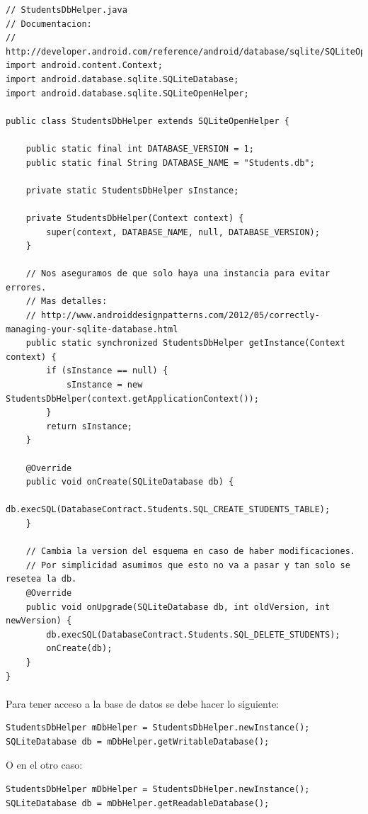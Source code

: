 \documentclass[10pt]{extarticle}
\begin{document}
\begin{lstlisting}
// StudentsDbHelper.java
// Documentacion:
// http://developer.android.com/reference/android/database/sqlite/SQLiteOpenHelper.html
import android.content.Context;
import android.database.sqlite.SQLiteDatabase;
import android.database.sqlite.SQLiteOpenHelper;

public class StudentsDbHelper extends SQLiteOpenHelper {

    public static final int DATABASE_VERSION = 1;
    public static final String DATABASE_NAME = "Students.db";

    private static StudentsDbHelper sInstance;

    private StudentsDbHelper(Context context) {
        super(context, DATABASE_NAME, null, DATABASE_VERSION);
    }
	
	// Nos aseguramos de que solo haya una instancia para evitar errores.
	// Mas detalles: 
	// http://www.androiddesignpatterns.com/2012/05/correctly-managing-your-sqlite-database.html
    public static synchronized StudentsDbHelper getInstance(Context context) {
        if (sInstance == null) {
            sInstance = new StudentsDbHelper(context.getApplicationContext());
        }
        return sInstance;
    }
	
    @Override
    public void onCreate(SQLiteDatabase db) {
        db.execSQL(DatabaseContract.Students.SQL_CREATE_STUDENTS_TABLE);
    }
	
	// Cambia la version del esquema en caso de haber modificaciones.
	// Por simplicidad asumimos que esto no va a pasar y tan solo se resetea la db.
    @Override
    public void onUpgrade(SQLiteDatabase db, int oldVersion, int newVersion) {
        db.execSQL(DatabaseContract.Students.SQL_DELETE_STUDENTS);
        onCreate(db);
    }
}
\end{lstlisting}

\paragraph{}
Para tener acceso a la base de datos se debe hacer lo siguiente:
\begin{lstlisting}
StudentsDbHelper mDbHelper = StudentsDbHelper.newInstance();
SQLiteDatabase db = mDbHelper.getWritableDatabase();
\end{lstlisting}
O en el otro caso:
\begin{lstlisting}
StudentsDbHelper mDbHelper = StudentsDbHelper.newInstance();
SQLiteDatabase db = mDbHelper.getReadableDatabase();
\end{lstlisting}
\end{document}
